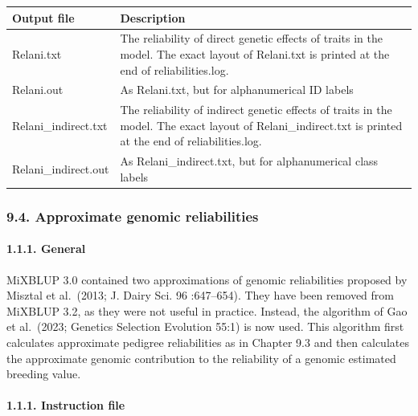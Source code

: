 {\def\LTcaptype{none} %
\begin{longtable}[]{@{}
  >{\raggedright\arraybackslash}p{}
  >{\raggedright\arraybackslash}p{}@{}}
\toprule\noalign{}
\begin{minipage}[b]{\linewidth}\raggedright
Output file
\end{minipage} & \begin{minipage}[b]{\linewidth}\raggedright
Description
\end{minipage} \\
\midrule\noalign{}
\endhead
\bottomrule\noalign{}
\endlastfoot
Relani.txt & The reliability of direct genetic effects of traits in the
model. The exact layout of Relani.txt is printed at the end of
reliabilities.log. \\
Relani.out & As Relani.txt, but for alphanumerical ID labels \\
Relani\_indirect.txt & The reliability of indirect genetic effects of
traits in the model. The exact layout of Relani\_indirect.txt is printed
at the end of reliabilities.log. \\
Relani\_indirect.out & As Relani\_indirect.txt, but for alphanumerical
class labels \\
\end{longtable}
}

\subsubsection{9.4. Approximate genomic reliabilities}\label{Reli21}

\paragraph{1.1.1. General}\label{Reli22}

MiXBLUP 3.0 contained two approximations of genomic reliabilities
proposed by Misztal et al.~(2013; J. Dairy Sci. 96 :647--654). They have
been removed from MiXBLUP 3.2, as they were not useful in practice.
Instead, the algorithm of Gao et al.~(2023; Genetics Selection Evolution
55:1) is now used. This algorithm first calculates approximate pedigree
reliabilities as in Chapter 9.3 and then calculates the approximate
genomic contribution to the reliability of a genomic estimated breeding
value.

\paragraph{1.1.1. Instruction file}\label{Reli23}

